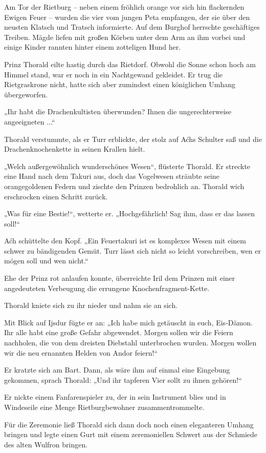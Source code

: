 Am Tor der Rietburg – neben einem fröhlich orange vor sich hin flackernden Ewigen Feuer – wurden die vier vom jungen Peta empfangen, der sie über den neusten Klatsch und Tratsch informierte. Auf dem Burghof herrschte geschäftiges Treiben. Mägde liefen mit großen Körben unter dem Arm an ihm vorbei und einige Kinder rannten hinter einem zotteligen Hund her.

Prinz Thorald eilte hastig durch das Rietdorf. Obwohl die Sonne schon hoch am Himmel stand, war er noch in ein Nachtgewand gekleidet. Er trug die Rietgraskrone nicht, hatte sich aber zumindest einen königlichen Umhang übergeworfen.

„Ihr habt die Drachenkultisten überwunden? Ihnen die ungerechterweise angeeigneten ...“

Thorald verstummte, als er Turr erblickte, der stolz auf Aćhs Schulter saß und die Drachenknochenkette in seinen Krallen hielt.

„Welch außergewöhnlich wunderschönes Wesen“, flüsterte Thorald. Er streckte eine Hand nach dem Takuri aus, doch das Vogelwesen sträubte seine orangegoldenen Federn und zischte den Prinzen bedrohlich an. Thorald wich erschrocken einen Schritt zurück.

„Was für eine Bestie!“, wetterte er. „Hochgefährlich! Sag ihm, dass er das lassen soll!“

Aćh schüttelte den Kopf. „Ein Feuertakuri ist es komplexes Wesen mit einem schwer zu bändigenden Gemüt. Turr lässt sich nicht so leicht vorschreiben, wen er mögen soll und wen nicht.“

Ehe der Prinz rot anlaufen konnte, überreichte Iril dem Prinzen mit einer angedeuteten Verbeugung die errungene Knochenfragment-Kette.

Thorald kniete sich zu ihr nieder und nahm sie an sich.

Mit Blick auf Ijsdur fügte er an: „Ich habe mich getäuscht in euch, Eis-Dämon. Ihr alle habt eine große Gefahr abgewendet. Morgen sollen wir die Feiern nachholen, die von dem dreisten Diebstahl unterbrochen wurden. Morgen wollen wir die neu ernannten Helden von Andor feiern!“

Er kratzte sich am Bart. Dann, als wäre ihm auf einmal eine Eingebung gekommen, sprach Thorald: „Und ihr tapferen Vier sollt zu ihnen gehören!“

Er nickte einem Fanfarenspieler zu, der in sein Instrument blies und in Windeseile eine Menge Rietburgbewohner zusammentrommelte.

Für die Zeremonie ließ Thorald sich dann doch noch einen eleganteren Umhang bringen und legte einen Gurt mit einem zeremoniellen Schwert aus der Schmiede des alten Wulfron bringen.

